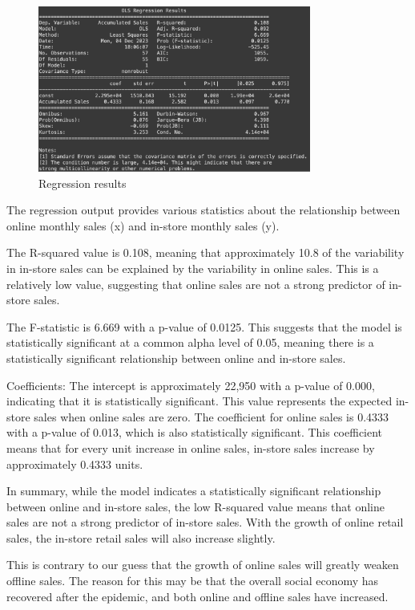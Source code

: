 \documentclass{article}
\begin{document}
\begin{figure}[h]
  \centering
  \includegraphics[width=0.8\textwidth]{Regression results.png}
  \caption{Regression results}
  \label{fig:yourlabel}
\end{figure}

The regression output provides various statistics about the relationship between online monthly sales (x) and in-store monthly sales (y).

The R-squared value is 0.108, meaning that approximately 10.8 of the variability in in-store sales can be explained by the variability in online sales. This is a relatively low value, suggesting that online sales are not a strong predictor of in-store sales.

The F-statistic is 6.669 with a p-value of 0.0125. This suggests that the model is statistically significant at a common alpha level of 0.05, meaning there is a statistically significant relationship between online and in-store sales.

Coefficients:
The intercept is approximately 22,950 with a p-value of 0.000, indicating that it is statistically significant. This value represents the expected in-store sales when online sales are zero.
The coefficient for online sales is 0.4333 with a p-value of 0.013, which is also statistically significant. This coefficient means that for every unit increase in online sales, in-store sales increase by approximately 0.4333 units.

In summary, while the model indicates a statistically significant relationship between online and in-store sales, the low R-squared value means that online sales are not a strong predictor of in-store sales. With the growth of online retail sales, the in-store retail sales will also increase slightly.

This is contrary to our guess that the growth of online sales will greatly weaken offline sales. The reason for this may be that the overall social economy has recovered after the epidemic, and both online and offline sales have increased.
\end{document}
